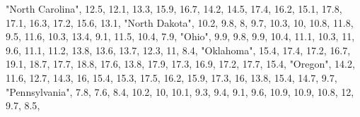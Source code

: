 \documentclass[
]{book}
\newenvironment{Shaded}{\begin{snugshade}}{\end{snugshade}}
\newcommand{\DecValTok}[1]{\textcolor[rgb]{0.00,0.00,0.81}{#1}}
\newcommand{\FloatTok}[1]{\textcolor[rgb]{0.00,0.00,0.81}{#1}}
\newcommand{\NormalTok}[1]{#1}
\newcommand{\StringTok}[1]{\textcolor[rgb]{0.31,0.60,0.02}{#1}}
\begin{document}
\begin{Shaded}
\begin{Highlighting}[]
        \StringTok{"North Carolina"}\NormalTok{, }\FloatTok{12.5}\NormalTok{, }\FloatTok{12.1}\NormalTok{, }\FloatTok{13.3}\NormalTok{, }\FloatTok{15.9}\NormalTok{, }\FloatTok{16.7}\NormalTok{, }\FloatTok{14.2}\NormalTok{, }\FloatTok{14.5}\NormalTok{, }\FloatTok{17.4}\NormalTok{, }\FloatTok{16.2}\NormalTok{, }\FloatTok{15.1}\NormalTok{, }\FloatTok{17.8}\NormalTok{, }\FloatTok{17.1}\NormalTok{, }\FloatTok{16.3}\NormalTok{, }\FloatTok{17.2}\NormalTok{, }\FloatTok{15.6}\NormalTok{, }\FloatTok{13.1}\NormalTok{,}
          \StringTok{"North Dakota"}\NormalTok{, }\FloatTok{10.2}\NormalTok{,  }\FloatTok{9.8}\NormalTok{,    }\DecValTok{8}\NormalTok{,  }\FloatTok{9.7}\NormalTok{, }\FloatTok{10.3}\NormalTok{,   }\DecValTok{10}\NormalTok{, }\FloatTok{10.8}\NormalTok{, }\FloatTok{11.8}\NormalTok{,  }\FloatTok{9.5}\NormalTok{, }\FloatTok{11.6}\NormalTok{, }\FloatTok{10.3}\NormalTok{, }\FloatTok{13.4}\NormalTok{,  }\FloatTok{9.1}\NormalTok{, }\FloatTok{11.5}\NormalTok{, }\FloatTok{10.4}\NormalTok{,  }\FloatTok{7.9}\NormalTok{,}
                  \StringTok{"Ohio"}\NormalTok{,  }\FloatTok{9.9}\NormalTok{,  }\FloatTok{9.8}\NormalTok{,  }\FloatTok{9.9}\NormalTok{, }\FloatTok{10.4}\NormalTok{, }\FloatTok{11.1}\NormalTok{, }\FloatTok{10.3}\NormalTok{,   }\DecValTok{11}\NormalTok{,  }\FloatTok{9.6}\NormalTok{, }\FloatTok{11.1}\NormalTok{, }\FloatTok{11.2}\NormalTok{, }\FloatTok{13.8}\NormalTok{, }\FloatTok{13.6}\NormalTok{, }\FloatTok{13.7}\NormalTok{, }\FloatTok{12.3}\NormalTok{,   }\DecValTok{11}\NormalTok{,  }\FloatTok{8.4}\NormalTok{,}
              \StringTok{"Oklahoma"}\NormalTok{, }\FloatTok{15.4}\NormalTok{, }\FloatTok{17.4}\NormalTok{, }\FloatTok{17.2}\NormalTok{, }\FloatTok{16.7}\NormalTok{, }\FloatTok{19.1}\NormalTok{, }\FloatTok{18.7}\NormalTok{, }\FloatTok{17.7}\NormalTok{, }\FloatTok{18.8}\NormalTok{, }\FloatTok{17.6}\NormalTok{, }\FloatTok{13.8}\NormalTok{, }\FloatTok{17.9}\NormalTok{, }\FloatTok{17.3}\NormalTok{, }\FloatTok{16.9}\NormalTok{, }\FloatTok{17.2}\NormalTok{, }\FloatTok{17.7}\NormalTok{, }\FloatTok{15.4}\NormalTok{,}
                \StringTok{"Oregon"}\NormalTok{, }\FloatTok{14.2}\NormalTok{, }\FloatTok{11.6}\NormalTok{, }\FloatTok{12.7}\NormalTok{, }\FloatTok{14.3}\NormalTok{,   }\DecValTok{16}\NormalTok{, }\FloatTok{15.4}\NormalTok{, }\FloatTok{15.3}\NormalTok{, }\FloatTok{17.5}\NormalTok{, }\FloatTok{16.2}\NormalTok{, }\FloatTok{15.9}\NormalTok{, }\FloatTok{17.3}\NormalTok{,   }\DecValTok{16}\NormalTok{, }\FloatTok{13.8}\NormalTok{, }\FloatTok{15.4}\NormalTok{, }\FloatTok{14.7}\NormalTok{,  }\FloatTok{9.7}\NormalTok{,}
          \StringTok{"Pennsylvania"}\NormalTok{,  }\FloatTok{7.8}\NormalTok{,  }\FloatTok{7.6}\NormalTok{,  }\FloatTok{8.4}\NormalTok{, }\FloatTok{10.2}\NormalTok{,   }\DecValTok{10}\NormalTok{, }\FloatTok{10.1}\NormalTok{,  }\FloatTok{9.3}\NormalTok{,  }\FloatTok{9.4}\NormalTok{,  }\FloatTok{9.1}\NormalTok{,  }\FloatTok{9.6}\NormalTok{, }\FloatTok{10.9}\NormalTok{, }\FloatTok{10.9}\NormalTok{, }\FloatTok{10.8}\NormalTok{,   }\DecValTok{12}\NormalTok{,  }\FloatTok{9.7}\NormalTok{,  }\FloatTok{8.5}\NormalTok{,}

\end{Highlighting}
\end{Shaded}
\end{document}
